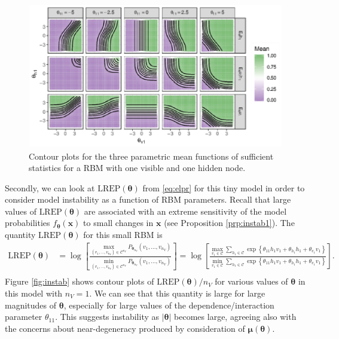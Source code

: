 \documentclass[]{article}
\theoremstyle{definition}
\newcommand{\nv}{{n_{\scriptscriptstyle V}}}
\begin{document}
\par
\begin{figure}

{\centering \includegraphics{paper_files/figure-latex/degen-toy-1} 

}

\caption{Contour plots for the three parametric mean functions of sufficient statistics for a RBM with one visible and one hidden node.}\label{fig:degen-toy}
\end{figure}
Secondly, we can look at \(\text{LREP}(\boldsymbol \theta)\) from
\eqref{eq:elpr} for this tiny model in order to consider model instability
as a function of RBM parameters. Recall that large values of
\(\text{LREP}(\boldsymbol \theta)\) are associated with an extreme
sensitivity of the model probabilities
\(f_{\boldsymbol \theta}(\boldsymbol x)\) to small changes in
\(\boldsymbol x\) (see Proposition \ref{prp:instab1}). The quantity
\(\text{LREP}(\boldsymbol \theta)\) for this small RBM is \begin{align*}
\text{LREP}(\boldsymbol \theta) &= \log \left[\frac{\max\limits_{(v_1, \dots, v_\nv) \in \mathcal{C}^\nv}P_{\boldsymbol \theta_\nv}(v_1, \dots, v_\nv)}{\min\limits_{(v_1, \dots, v_\nv) \in \mathcal{C}^\nv}P_{\boldsymbol \theta_\nv}(v_1, \dots, v_\nv)}\right] = \log \left[\frac{\max\limits_{v_1 \in \mathcal{C}}\sum\limits_{h_1 \in \mathcal{C}}\exp\left\{\theta_{11} h_1 v_1 + \theta_{h_1}h_1 + \theta_{v_1} v_1 \right\}}{\min\limits_{v_1 \in \mathcal{C}}\sum\limits_{h_1 \in \mathcal{C}}\exp\left\{\theta_{11} h_1 v_1 + \theta_{h_1}h_1 + \theta_{v_1} v_1 \right\}}\right]. \\
\end{align*}
Figure \ref{fig:instab} shows contour plots of
\(\text{LREP}(\boldsymbol \theta)/\nv\) for various values of
\(\boldsymbol \theta\) in this model with \(\nv = 1\). We can see that
this quantity is large for large magnitudes of \(\boldsymbol \theta\),
especially for large values of the dependence/interaction parameter
\(\theta_{11}\). This suggests instability as \(|\boldsymbol \theta|\)
becomes large, agreeing also with the concerns about near-degeneracy
produced by consideration of \(\boldsymbol \mu(\boldsymbol \theta)\).
\end{document}
